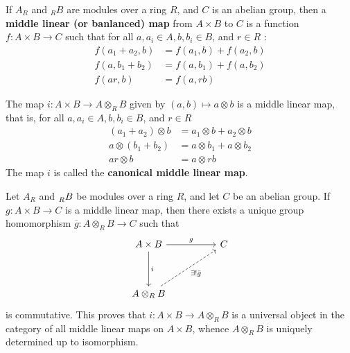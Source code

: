 \begin{definition}
    If $A_R$ and ${ }_R B$ are modules over a ring $R$, and $C$ is an abelian group, then a \textbf{middle linear (or banlanced) map} from $A \times B$ to $C$ is a function $f: A \times B \rightarrow C$ such that for all $a, a_i \in A, b, b_i \in B$, and $r \in R$ :
    \begin{equation*}
        \begin{aligned}
            f\left(a_1+a_2, b\right) & =f\left(a_1, b\right)+f\left(a_2, b\right) \\
            f\left(a, b_1+b_2\right) & =f\left(a, b_1\right)+f\left(a, b_2\right) \\
            f(a r, b)                & =f(a, r b)
        \end{aligned}
    \end{equation*}
    \begin{remark}
        The map $i: A \times B \rightarrow A \otimes_R B$ given by $(a, b) \mapsto a \otimes b$ is a middle linear map, that is,
        for all $a, a_i \in A, b, b_i \in B$, and $r \in R$
        \begin{equation*}
            \begin{aligned}
                \left(a_1+a_2\right) \otimes b & =a_1 \otimes b+a_2 \otimes b \\
                a \otimes\left(b_1+b_2\right)  & =a \otimes b_1+a \otimes b_2 \\
                a r \otimes b                  & =a \otimes r b
            \end{aligned}
        \end{equation*}
        The map $i$ is called the \textbf{canonical middle linear map}.
    \end{remark}
\end{definition}



\begin{theorem}
    \label{thm: Universal property of canonical middle linear map}
    Let $A_{{R}}$ and $\prescript{ }{R}{B}$ be modules over a ring $R$, and let $C$ be an abelian group.
    If ${g}: A \times B \rightarrow C$ is a middle linear map, then there exists a unique group homomorphism $\overline{{g}}: A \otimes_{{R}} B \rightarrow C$ such that
    \begin{equation*}
        \begin{tikzcd}
            A \times B \arrow[rr, "g"] \arrow[dd, "i"]  & & C \\
            &   &      \\
            A \otimes_R B \arrow[rruu,dashed, "\exists! \bar{g}"']  &     &
        \end{tikzcd}
    \end{equation*}
    is commutative.
    This proves that $i: A \times B \rightarrow A \otimes_R B$ is a universal object in the category of all middle linear maps on $A \times B$, whence $A \otimes_R B$ is uniquely determined up to isomorphism.
\end{theorem}

